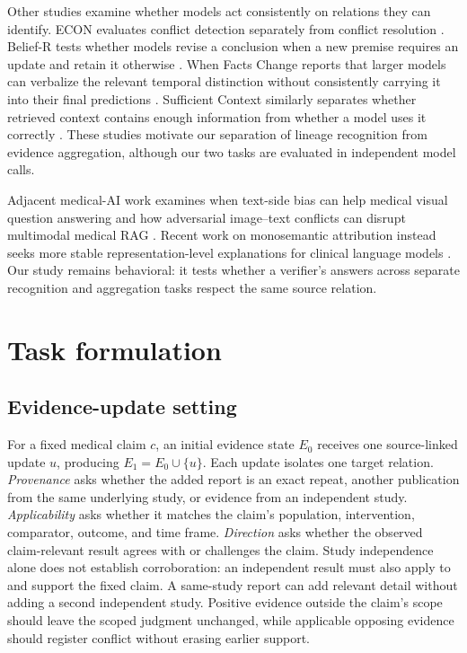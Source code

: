 \documentclass[11pt]{article}
\begin{document}
Other studies examine whether models act consistently on relations they can identify. ECON evaluates conflict detection separately from conflict resolution \citep{jiayang-etal-2024-econ}. Belief-R tests whether models revise a conclusion when a new premise requires an update and retain it otherwise \citep{wilie-etal-2024-belief}. When Facts Change reports that larger models can verbalize the relevant temporal distinction without consistently carrying it into their final predictions \citep{wallat-etal-2026-facts}. Sufficient Context similarly separates whether retrieved context contains enough information from whether a model uses it correctly \citep{joren-etal-2025-sufficient}. These studies motivate our separation of lineage recognition from evidence aggregation, although our two tasks are evaluated in independent model calls.


Adjacent medical-AI work examines when text-side bias can help medical visual question answering and how adversarial image--text conflicts can disrupt multimodal medical RAG \citep{sun2022unimodal,zuo2025make}. Recent work on monosemantic attribution instead seeks more stable representation-level explanations for clinical language models \citep{mamalakis2026monosemantic}. Our study remains behavioral: it tests whether a verifier's answers across separate recognition and aggregation tasks respect the same source relation.

\section{Task formulation}
\label{sec:task}

\subsection{Evidence-update setting}

For a fixed medical claim $c$, an initial evidence state $E_0$ receives one source-linked update $u$, producing $E_1=E_0\cup\{u\}$. Each update isolates one target relation. \emph{Provenance} asks whether the added report is an exact repeat, another publication from the same underlying study, or evidence from an independent study. \emph{Applicability} asks whether it matches the claim's population, intervention, comparator, outcome, and time frame. \emph{Direction} asks whether the observed claim-relevant result agrees with or challenges the claim. Study independence alone does not establish corroboration: an independent result must also apply to and support the fixed claim. A same-study report can add relevant detail without adding a second independent study. Positive evidence outside the claim's scope should leave the scoped judgment unchanged, while applicable opposing evidence should register conflict without erasing earlier support.
\end{document}
